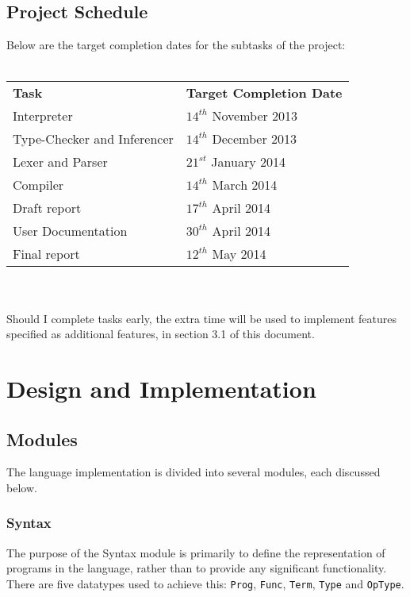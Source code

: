 \documentclass{article}
\begin{document}
\subsection{Project Schedule}
Below are the target completion dates for the subtasks of the project:
\\\\
\begin{tabular}{l l}
    \indent \textbf{Task}               & \textbf{Target Completion Date} \\
    \indent Interpreter                 & $14^{th}$ November 2013         \\
    \indent Type-Checker and Inferencer & $14^{th}$ December 2013         \\
    \indent Lexer and Parser            & $21^{st}$ January  2014         \\
    \indent Compiler                    & $14^{th}$ March    2014         \\
    \indent Draft report                & $17^{th}$ April    2014         \\
    \indent User Documentation          & $30^{th}$ April    2014         \\
    \indent Final report                & $12^{th}$ May      2014         \\
\end{tabular}
\\\\
Should I complete tasks early, the extra time will be used to implement features specified as additional features, in section 3.1 of this document.

\pagebreak
\section{Design and Implementation}
\subsection{Modules}
The language implementation is divided into several modules, each discussed below.
\subsubsection{Syntax}
The purpose of the Syntax module is primarily to define the representation of programs in the language, rather than to provide any significant functionality. There are five datatypes used to achieve this: \texttt{Prog}, \texttt{Func}, \texttt{Term}, \texttt{Type} and \texttt{OpType}.
\end{document}
